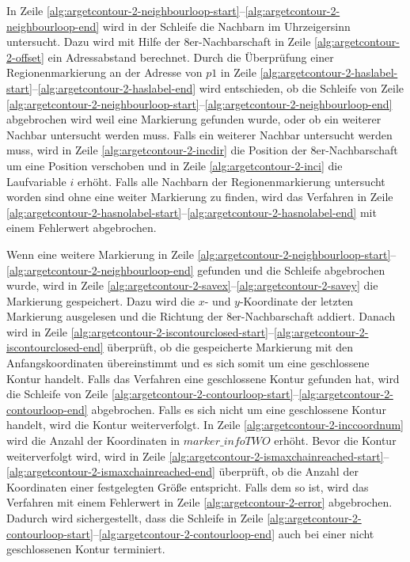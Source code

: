 In Zeile \ref{alg:argetcontour-2-neighbourloop-start}--\ref{alg:argetcontour-2-neighbourloop-end} wird in der Schleife
 die Nachbarn im Uhrzeigersinn untersucht. Dazu wird mit Hilfe der 8er-Nachbarschaft in Zeile
 \ref{alg:argetcontour-2-offset} ein Adressabstand berechnet. Durch die Überprüfung einer Regionenmarkierung an der
 Adresse von $\mathit{p1}$ in Zeile \ref{alg:argetcontour-2-haslabel-start}--\ref{alg:argetcontour-2-haslabel-end} wird
 entschieden, ob die Schleife von Zeile
 \ref{alg:argetcontour-2-neighbourloop-start}--\ref{alg:argetcontour-2-neighbourloop-end} abgebrochen wird weil eine
 Markierung gefunden wurde, oder ob ein weiterer Nachbar untersucht werden muss. Falls ein weiterer Nachbar untersucht
 werden muss, wird in Zeile \ref{alg:argetcontour-2-incdir} die Position der 8er-Nachbarschaft um eine Position
 verschoben und in Zeile \ref{alg:argetcontour-2-inci} die Laufvariable $i$ erhöht. Falls alle Nachbarn der
 Regionenmarkierung untersucht worden sind ohne eine weiter Markierung zu finden, wird das Verfahren in Zeile
 \ref{alg:argetcontour-2-hasnolabel-start}--\ref{alg:argetcontour-2-hasnolabel-end} mit einem Fehlerwert abgebrochen.

Wenn eine weitere Markierung in Zeile
 \ref{alg:argetcontour-2-neighbourloop-start}--\ref{alg:argetcontour-2-neighbourloop-end} gefunden und die Schleife
 abgebrochen wurde, wird in Zeile \ref{alg:argetcontour-2-savex}--\ref{alg:argetcontour-2-savey} die Markierung
 gespeichert. Dazu wird die $x$- und $y$-Koordinate der letzten Markierung ausgelesen und die Richtung der
 8er-Nachbarschaft addiert. Danach wird in Zeile
 \ref{alg:argetcontour-2-iscontourclosed-start}--\ref{alg:argetcontour-2-iscontourclosed-end} überprüft, ob die
 gespeicherte Markierung mit den Anfangskoordinaten übereinstimmt und es sich somit um eine geschlossene Kontur
 handelt. Falls das Verfahren eine geschlossene Kontur gefunden hat, wird die Schleife von Zeile
 \ref{alg:argetcontour-2-contourloop-start}--\ref{alg:argetcontour-2-contourloop-end} abgebrochen. Falls es sich nicht
 um eine geschlossene Kontur handelt, wird die Kontur weiterverfolgt. In Zeile \ref{alg:argetcontour-2-inccoordnum}
 wird die Anzahl der Koordinaten in $\mathit{marker\_infoTWO}$ erhöht. Bevor die Kontur weiterverfolgt wird, wird in
 Zeile \ref{alg:argetcontour-2-ismaxchainreached-start}--\ref{alg:argetcontour-2-ismaxchainreached-end} überprüft, ob
 die Anzahl der Koordinaten einer festgelegten Größe entspricht. Falls dem so ist, wird das Verfahren mit einem
 Fehlerwert in Zeile \ref{alg:argetcontour-2-error} abgebrochen. Dadurch wird sichergestellt, dass die Schleife in
 Zeile \ref{alg:argetcontour-2-contourloop-start}--\ref{alg:argetcontour-2-contourloop-end} auch bei einer nicht
 geschlossenen Kontur terminiert.

